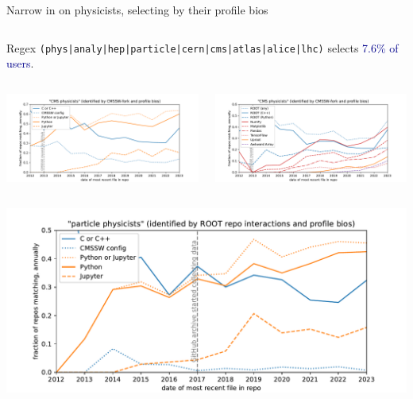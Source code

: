 \documentclass[aspectratio=169]{beamer}
\begin{document}
\begin{frame}{Narrow in on physicists, selecting by their profile bios}
\vspace{0.15 cm}
\small
\begin{columns}
Regex \texttt{(phys|analy|hep|particle|cern|cms|atlas|alice|lhc)} selects \textcolor{darkblue}{7.6\% of users}.
\end{columns}

\begin{columns}
\includegraphics[width=\linewidth]{analysis/github-language-cmsswseed-tight-fraction.pdf}

\hspace{-0.25 cm}\includegraphics[width=\linewidth]{analysis/github-package-cmsswseed-tight-fraction.pdf}
\end{columns}

\vspace{-0.25 cm}
\begin{columns}
\includegraphics[width=\linewidth]{analysis/github-language-rootseed-tight-fraction.pdf}


\end{columns}
\end{frame}
\end{document}
